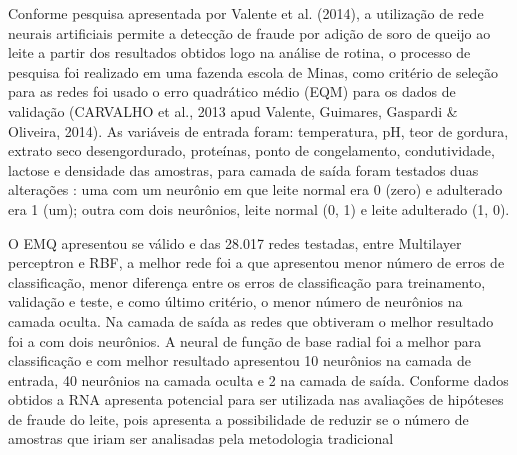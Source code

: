 \documentclass[a4paper,11pt]{article}
\begin{document}
\begin{multicols}{2}
Conforme pesquisa apresentada por Valente et al. (2014), a utilização de rede neurais artificiais permite a detecção de fraude por adição de soro de queijo ao leite a partir dos resultados obtidos logo na análise de rotina, o processo de pesquisa foi realizado em uma fazenda escola de Minas,  como critério de seleção para as redes foi usado o erro quadrático médio (EQM) para os dados de validação (CARVALHO et al., 2013 apud Valente, Guimares, Gaspardi \& Oliveira, 2014). As variáveis de entrada foram: temperatura, pH, teor de gordura, extrato seco desengordurado, proteínas, ponto de congelamento, condutividade, lactose e densidade das amostras, para camada de saída foram testados duas alterações : uma com um neurônio em que leite normal era 0 (zero) e adulterado era 1 (um); outra com dois neurônios, leite normal (0, 1) e leite adulterado (1, 0). 

O EMQ apresentou se válido e das 28.017 redes testadas, entre Multilayer perceptron e RBF, a melhor rede foi a que apresentou menor número de erros de classificação, menor diferença entre os erros de classificação para treinamento, validação e teste, e como último critério, o menor número de neurônios na camada oculta. Na camada de saída as redes que obtiveram o melhor resultado foi a  com dois neurônios. 
A neural de função de base radial foi a melhor para classificação e com melhor resultado apresentou 10 neurônios na camada de entrada, 40 neurônios na camada oculta e 2 na camada de saída.
Conforme dados obtidos a RNA apresenta potencial para ser utilizada nas avaliações de hipóteses de fraude do leite, pois apresenta a possibilidade de reduzir se o número de amostras que iriam ser analisadas pela metodologia tradicional










\end{multicols}
\end{document}
